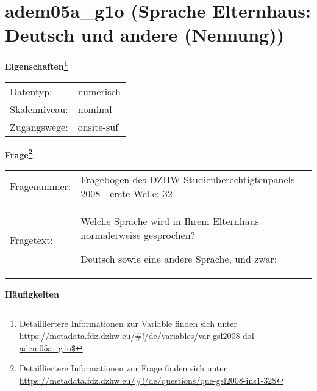 
    \setcounter{footnote}{0}

    \vspace*{-1.8cm}
	\section{adem05a\_g1o (Sprache Elternhaus: Deutsch und andere (Nennung))}
	\label{section:adem05a_g1o}



    \vspace*{0.5cm}
    \noindent\textbf{Eigenschaften\footnote{Detailliertere Informationen zur Variable finden sich unter
		\url{https://metadata.fdz.dzhw.eu/\#!/de/variables/var-gsl2008-ds1-adem05a_g1o$}}}\\
	\begin{tabularx}{\hsize}{@{}lX}
	Datentyp: & numerisch \\
	Skalenniveau: & nominal \\
	Zugangswege: &
	  onsite-suf
 \\
    \end{tabularx}



				\vspace*{0.5cm}
                \noindent\textbf{Frage\footnote{Detailliertere Informationen zur Frage finden sich unter
		              \url{https://metadata.fdz.dzhw.eu/\#!/de/questions/que-gsl2008-ins1-32$}}}\\
				\begin{tabularx}{\hsize}{@{}lX}
					Fragenummer: &
					  Fragebogen des DZHW-Studienberechtigtenpanels 2008 - erste Welle:
					  32
 \\
					Fragetext: & Welche Sprache wird in Ihrem Elternhaus normalerweise gesprochen?\par  Deutsch sowie eine andere Sprache, und zwar: \\
				\end{tabularx}





        		\vspace*{0.5cm}
                \noindent\textbf{Häufigkeiten}

